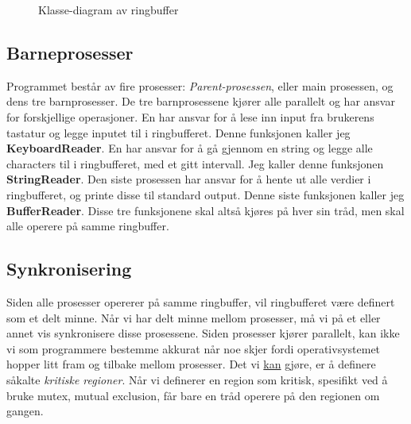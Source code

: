 \documentclass[a4paper, 12pt]{article}
\begin{document}
    \begin{figure}[h!]
      \centering
      \caption{Klasse-diagram av ringbuffer}
      \label{fig:class_diagram}
    \end{figure}

    \subsection{Barneprosesser}
    Programmet består av fire prosesser: \textit{Parent-prosessen}, eller main prosessen, og dens tre barnprosesser. De tre barnprosessene kjører alle parallelt og har ansvar for forskjellige operasjoner. En har ansvar for å lese inn input fra brukerens tastatur og legge inputet til i ringbufferet. Denne funksjonen kaller jeg \textbf{KeyboardReader}. En har ansvar for å gå gjennom en string og legge alle characters til i ringbufferet, med et gitt intervall. Jeg kaller denne funksjonen \textbf{StringReader}. Den siste prosessen har ansvar for å hente ut alle verdier i ringbufferet, og printe disse til standard output. Denne siste funksjonen kaller jeg \textbf{BufferReader}. Disse tre funksjonene skal altså kjøres på hver sin tråd, men skal alle operere på samme ringbuffer.

    \subsection{Synkronisering}
    Siden alle prosesser opererer på samme ringbuffer, vil ringbufferet være definert som et delt minne. Når vi har delt minne mellom prosesser, må vi på et eller annet vis synkronisere disse prosessene. Siden prosesser kjører parallelt, kan ikke vi som programmere bestemme akkurat når noe skjer fordi operativsystemet hopper litt fram og tilbake mellom prosesser. Det vi \underline{kan} gjøre, er å definere såkalte \textit{kritiske regioner}. Når vi definerer en region som kritisk, spesifikt ved å bruke mutex, mutual exclusion, får bare en tråd operere på den regionen om gangen. 
    
\end{document}
